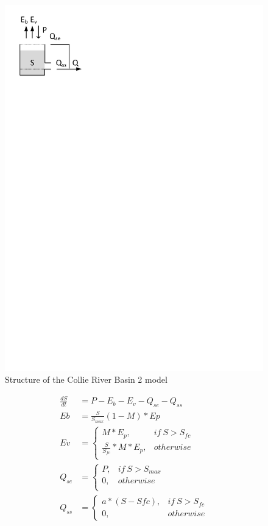 { 																	%
\begin{figure}
\includegraphics[trim=1cm 24cm 9cm 1cm,keepaspectratio]{./AppA_files/03_schematic.pdf}
\caption{Structure of the Collie River Basin 2 model} \label{fig:03_schematic}
\end{figure}

\begin{align}
	\frac{dS}{dt} &= P -E_b - E_v -Q_{se}-Q_{ss} \\
	Eb &= \frac{S}{S_{max}}(1-M)*Ep\\
	Ev &= 
		\begin{cases}
			M*E_p, & if~S>S_{fc}\\
			\frac{S}{S_{fc}}*M*E_p, &otherwise\\
		\end{cases}\\
	Q_{se} &= 
		\begin{cases}
			P, & if~S>S_{max}\\
			0, & otherwise \\
		\end{cases}\\
	Q_{ss} &= 
		\begin{cases}
			a*(S-S{fc}), & if~S>S_{fc}\\
			0, & otherwise 
		\end{cases}
\end{align}
}
\vspace{0.5cm}

